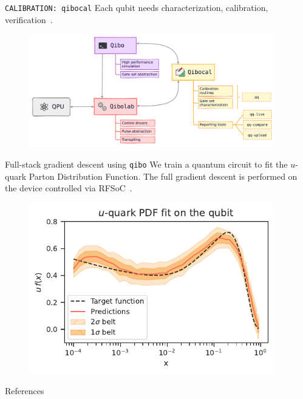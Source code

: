 \documentclass[20pt, final]{beamer}
\newlength{\sepwidth}
\newlength{\colwidth}
\newcommand{\separatorcolumn}{\begin{column}{\sepwidth}\end{column}}
\begin{document}
\begin{frame}[t]
\begin{columns}[t]
\begin{column}{\colwidth}
  \begin{block}{\texttt{CALIBRATION: qibocal}}
  Each qubit needs characterization, calibration, verification~\cite{pasquale2023opensource}.
  \begin{figure}
    \includegraphics[width=1  \textwidth]{figures/qibocal.pdf}
  \end{figure}
  \end{block}

  \begin{block}{Full-stack gradient descent using \texttt{qibo}}
  We train a quantum circuit to fit the $u$-quark Parton Distribution Function. 
  The full gradient descent
  is performed on the device controlled via RFSoC~\cite{efthymiou2023qibolab}.
  \begin{figure}
    \includegraphics[width=0.8  \textwidth]{figures/qpdf.pdf}
  \end{figure}
  \end{block}

  \begin{block}{References}
  \nocite{*}
    \small {}
  \end{block}

\end{column}

\separatorcolumn
\end{columns}
\end{frame}
\end{document}
